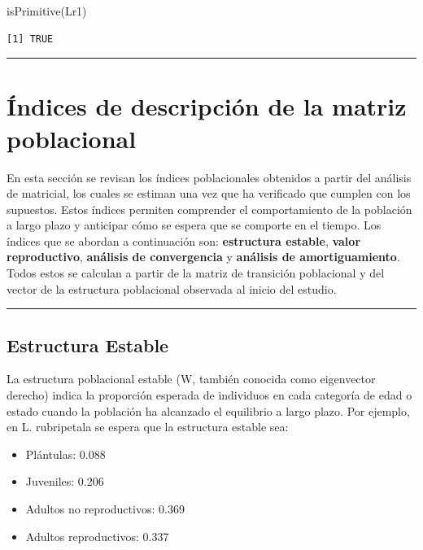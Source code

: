 \documentclass[
  12pt,
  letterpaper,
]{book}
\newenvironment{Shaded}{\begin{snugshade}}{\end{snugshade}}
\newcommand{\FunctionTok}[1]{\textcolor[rgb]{0.28,0.35,0.67}{#1}}
\newcommand{\NormalTok}[1]{\textcolor[rgb]{0.00,0.23,0.31}{#1}}
\providecommand{\tightlist}{%
  \setlength{\itemsep}{0pt}\setlength{\parskip}{0pt}}\usepackage{longtable,booktabs,array}
\begin{document}
\begin{Shaded}
\begin{Highlighting}[]
\FunctionTok{isPrimitive}\NormalTok{(Lr1)}
\end{Highlighting}
\end{Shaded}

\begin{verbatim}
[1] TRUE
\end{verbatim}

\begin{center}\rule{0.5\linewidth}{0.5pt}\end{center}

\section{Índices de descripción de la matriz
poblacional}\label{uxedndices-de-descripciuxf3n-de-la-matriz-poblacional}

En esta sección se revisan los índices poblacionales obtenidos a partir
del análisis de matricial, los cuales se estiman una vez que ha
verificado que cumplen con los supuestos. Estos índices permiten
comprender el comportamiento de la población a largo plazo y anticipar
cómo se espera que se comporte en el tiempo. Los índices que se abordan
a continuación son: \textbf{estructura estable}, \textbf{valor
reproductivo}, \textbf{análisis de convergencia} y \textbf{análisis de
amortiguamiento}. Todos estos se calculan a partir de la matriz de
transición poblacional y del vector de la estructura poblacional
observada al inicio del estudio.

\begin{center}\rule{0.5\linewidth}{0.5pt}\end{center}

\subsection{Estructura Estable}\label{estructura-estable}

La estructura poblacional estable (W, también conocida como eigenvector
derecho) indica la proporción esperada de individuos en cada categoría
de edad o estado cuando la población ha alcanzado el equilibrio a largo
plazo. Por ejemplo, en L. rubripetala se espera que la estructura
estable sea:

\begin{itemize}
\tightlist
\item
  Plántulas: 0.088
\item
  Juveniles: 0.206
\item
  Adultos no reproductivos: 0.369
\item
  Adultos reproductivos: 0.337
\end{itemize}
\end{document}
